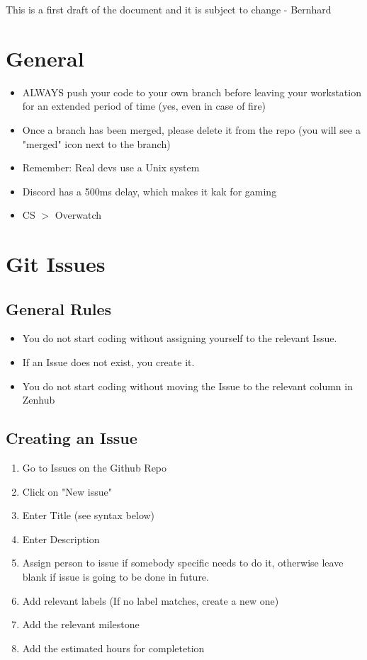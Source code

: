 \documentclass{article}
\begin{document}
\newpage
\tableofcontents
\newpage

	This is a first draft of the document and it is subject to change - Bernhard
	\section{General}
		\begin{itemize}
			\item ALWAYS push your code to your own branch before leaving your workstation for an extended period of time (yes, even in case of fire)
			\item Once a branch has been merged, please delete it from the repo (you will see a "merged" icon next to the branch)
			\item Remember: Real devs use a Unix system
			\item Discord has a 500ms delay, which makes it kak for gaming
			\item CS $>$ Overwatch
		\end{itemize}

	\section{Git Issues}
		\subsection{General Rules}
			\begin{itemize}
				\item You do not start coding without assigning yourself to the relevant Issue.
				\item If an Issue does not exist, you create it.
				\item You do not start coding without moving the Issue to the relevant column in Zenhub
			\end{itemize}

		\subsection{Creating an Issue}
			\begin{enumerate}
				\item Go to Issues on the Github Repo
				\item Click on "New issue"
				\item Enter Title (see syntax below)
				\item Enter Description
				\item Assign person to issue if somebody specific needs to do it, otherwise leave blank if issue is going to be done in future.
				\item Add relevant labels (If no label matches, create a new one)
				\item Add the relevant milestone
				\item Add the estimated hours for completetion
			\end{enumerate}
\end{document}
